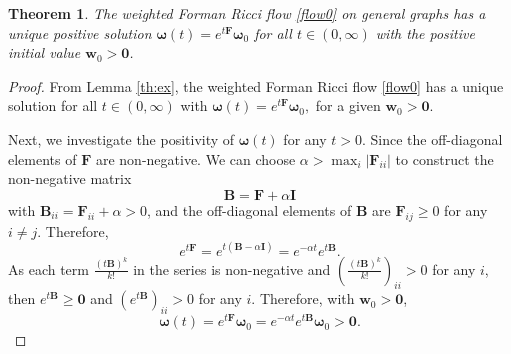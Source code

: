 \documentclass{article}
\newtheorem{theorem}{Theorem}[section]
\begin{document}
\begin{theorem}\label{th:exist}
The weighted Forman Ricci flow \eqref{flow0} on general graphs has a unique positive solution \(\bm \omega(t) = e^{t\bm F} \bm \omega_0\) for all $t\in(0,\infty)$ with the positive initial value $\bm w_0>\bm 0$.
\end{theorem}
\begin{proof}
From Lemma \ref{th:ex}, the weighted Forman Ricci flow \eqref{flow0} has a unique  solution for all $t\in(0,\infty)$ with
\(\bm \omega(t) = e^{t\textbf{F}} \bm \omega_0,\)
for a given $\bm w_0>\bm 0$.

Next, we investigate the positivity of $\bm \omega(t)$ for any $t>0$. Since the off-diagonal elements of \( \textbf{F}\)  are non-negative. We can choose  \(\alpha >\max_i |\textbf{F}_{ii}|\) to construct the non-negative matrix 
\[ \textbf{B} = \textbf{F} + \alpha \bm I \]
with \( \textbf{B}_{ii} = \textbf{F}_{ii} + \alpha> 0 \), and 
the off-diagonal elements of \( \textbf{B} \) are \( \textbf{F}_{ij} \geq 0 \) for any $i\neq j$. Therefore,
    \[
    e^{t\textbf{F}} = e^{t(\textbf{B} - \alpha \textbf{I})} 
           = e^{-\alpha t} e^{t \textbf{B}}.
    \]
As each term \( \frac{(t\textbf{B})^k}{k!} \) in the series is non-negative and $\left( \frac{(t\textbf{B})^k}{k!} \right)_{ii}>0$ for any $i$, then $e^{t\textbf{B}}\geq \bm 0$ and $(e^{t\textbf{B}})_{ii}>0$ for any $i$. Therefore, with $\bm w_0>\bm 0$, 
\[\bm \omega(t) = e^{t\textbf{F}} \bm \omega_0= e^{-\alpha t} e^{t \textbf{B}}\bm \omega_0>\bm 0.\]
\end{proof}

\end{document}
